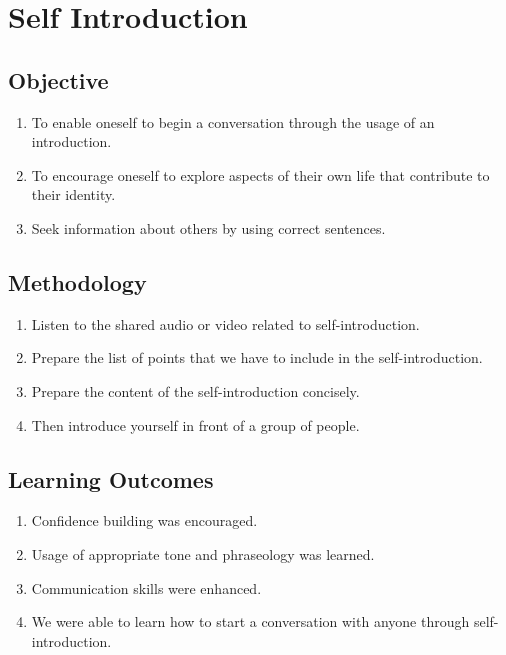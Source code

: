 \section{Self Introduction}
\label{Self Introduction}
\subsection{Objective}

\begin{enumerate}
      \item To enable oneself to begin a conversation through the usage of an introduction.
      \item To encourage oneself to explore aspects of their own life that contribute to their identity.
      \item Seek information about others by using correct sentences.

\end{enumerate}

\subsection{Methodology}

\begin{enumerate}
      \item Listen to the shared audio or video related to self-introduction.
      \item Prepare the list of points that we have to include in the self-introduction.
      \item Prepare the content of the self-introduction concisely.
      \item Then introduce yourself in front of a group of people.
\end{enumerate}

\subsection{Learning Outcomes}

\begin{enumerate}
      \item Confidence building was encouraged.
      \item Usage of appropriate tone and phraseology was learned.
      \item Communication skills were enhanced.
      \item We were able to learn how to start a conversation with anyone through self-introduction.
\end{enumerate}

